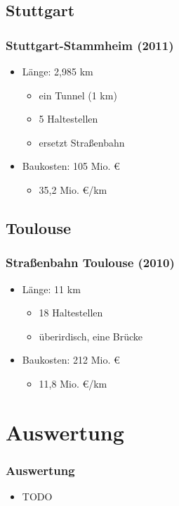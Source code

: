 \documentclass{beamer}
\begin{document}

\subsection{Stuttgart}
\begin{frame}
  \frametitle{Stuttgart-Stammheim (2011)}

  \begin{itemize}
    \item Länge: 2,985 km
      \begin{itemize}
        \item ein Tunnel (1 km)
        \item 5 Haltestellen
        \item ersetzt Straßenbahn
      \end{itemize}
    \item Baukosten: 105 Mio. €
    \begin{itemize}
        \item 35,2 Mio. €/km
    \end{itemize}
  \end{itemize}
\end{frame}

\subsection{Toulouse}
\begin{frame}
  \frametitle{Straßenbahn Toulouse (2010)}
  \begin{itemize}
    \item Länge: 11 km
      \begin{itemize}
        \item 18 Haltestellen
        \item überirdisch, eine Brücke
      \end{itemize}
    \item Baukosten: 212 Mio. €
    \begin{itemize}
        \item 11,8 Mio. €/km
    \end{itemize}
  \end{itemize}
\end{frame}


\section{Auswertung}
\begin{frame}
    \frametitle{Auswertung}
    \begin{itemize}
      \item TODO
    \end{itemize}
\end{frame}
\end{document}
